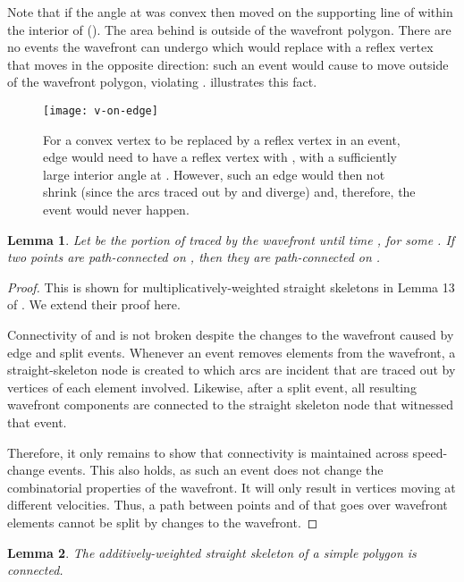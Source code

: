 \documentclass[preprint]{elsarticle}
\newtheorem{lemma}{Lemma}
\begin{document}
Note that if the angle at  was convex then  moved on the supporting line
of  within the interior of  ().  The area
behind  is outside of the wavefront polygon.  There are no events the
wavefront can undergo which would replace  with a reflex vertex  that
moves in the opposite direction: such an event would cause  to move
outside of the wavefront polygon, violating .
 illustrates this fact.

\begin{figure}[ht!]
  \centering
  \texttt{[image: v-on-edge]}
  \caption{For a convex vertex  to be replaced by a reflex vertex  in
    an event, edge  would need to have a reflex vertex  with
    , with a sufficiently large interior angle at .
    However, such an edge  would then not shrink (since the arcs traced
    out by  and  diverge) and, therefore, the event
    would never happen.  }
  \label{fig:v-on-edge-no-backtrack}
\end{figure}


\begin{lemma}
 \label{lem:pathconnected}
  Let  be the portion of   traced by
  the wavefront until time , for some .
  If two points 
  are path-connected on , then they
  are path-connected on .
\end{lemma}
\begin{proof}
  This is shown for multiplicatively-weighted straight skeletons in
  Lemma 13 of \cite{Bie&15a}.  We extend their proof here.

  Connectivity of  and  is not broken despite the changes to the
  wavefront caused by edge and split events.  Whenever an event removes
  elements from the wavefront, a straight-skeleton node is created to
  which arcs are incident that are traced out by vertices of each
  element involved.  Likewise, after a split event, all resulting
  wavefront components are connected to the straight skeleton node that
  witnessed that event.

  Therefore, it only remains to show that connectivity is maintained
  across speed-change events.
This also holds, as such an event does not change the combinatorial
  properties of the wavefront.  It will only result in vertices
  moving at different velocities.  Thus, a path between points  and 
  of  that goes over wavefront elements cannot be
  split by changes to the wavefront.
\end{proof}

\begin{lemma}
   \label{lem:connected}
   The additively-weighted straight skeleton of a simple polygon  is
   connected.
\end{lemma}
\end{document}
